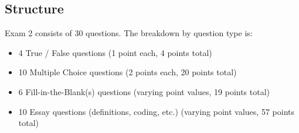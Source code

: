 \documentclass{report}
\title{\Huge{}}
\author{\huge{Nathan Warner}}
\date{\huge{}}
\begin{document}
    \tableofcontents
    \pagebreak 
    \bigbreak \noindent 
    \subsection{Structure}
    Exam 2 consists of 30 questions. The breakdown by question type is:
    \begin{itemize}
        \item 4 True / False questions (1 point each, 4 points total)
        \item 10 Multiple Choice questions (2 points each, 20 points total)
        \item 6 Fill-in-the-Blank(s) questions (varying point values, 19 points total)
        \item 10 Essay questions (definitions, coding, etc.) (varying point values, 57 points total)
    \end{itemize}
    \bigbreak \noindent 
\end{document}
